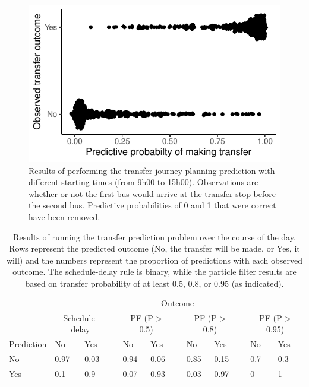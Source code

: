 \begin{knitrout}\small
{}\color{fgcolor}\begin{figure}

{\centering \includegraphics[width=.5\textwidth]{figure/eta_journey_transfer_many-1} 

}

\caption[Results of performing the transfer journey planning prediction with different starting times]{Results of performing the transfer journey planning prediction with different starting times (from  9h00 to 15h00). Observations are whether or not the first bus would arrive at the transfer stop before the second bus. Predictive probabilities of 0 and 1 that were correct have been removed.}\label{fig:eta_journey_transfer_many}
\end{figure}

\begin{table}

\caption{\label{tab:eta_journey_transfer_many}Results of running the transfer prediction problem over the course of the day. Rows represent the predicted outcome (No, the transfer will be made, or Yes, it will) and the numbers represent the proportion of predictions with each observed outcome. The schedule-delay rule is binary, while the particle filter results are based on transfer probability of at least 0.5, 0.8, or 0.95 (as indicated).}
\centering
\fontsize{8}{10}\selectfont
\begin{tabular}[t]{llllllllllll}
\toprule
\multicolumn{1}{c}{} & \multicolumn{11}{c}{Outcome} \\
\cmidrule(l{3pt}r{3pt}){2-12}
\multicolumn{1}{c}{} & \multicolumn{2}{c}{Schedule-delay} & \multicolumn{1}{c}{} & \multicolumn{2}{c}{PF (P > 0.5)} & \multicolumn{1}{c}{} & \multicolumn{2}{c}{PF (P > 0.8)} & \multicolumn{1}{c}{} & \multicolumn{2}{c}{PF (P > 0.95)} \\
\cmidrule(l{3pt}r{3pt}){2-3} \cmidrule(l{3pt}r{3pt}){5-6} \cmidrule(l{3pt}r{3pt}){8-9} \cmidrule(l{3pt}r{3pt}){11-12}
Prediction & No & Yes &  & No & Yes &  & No & Yes &  & No & Yes\\
\midrule
No & 0.97 & 0.03 &  & 0.94 & 0.06 &  & 0.85 & 0.15 &  & 0.7 & 0.3\\
Yes & 0.1 & 0.9 &  & 0.07 & 0.93 &  & 0.03 & 0.97 &  & 0 & 1\\
\bottomrule
\end{tabular}
\end{table}


\end{knitrout}



